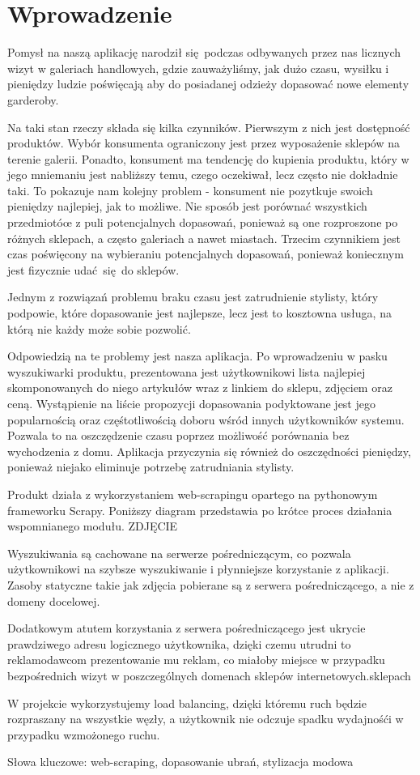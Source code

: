 \chapter{Wprowadzenie}

Pomysł na naszą aplikację narodził się podczas odbywanych przez nas licznych wizyt w galeriach handlowych, gdzie zauważyliśmy, jak dużo czasu, wysiłku i pieniędzy ludzie poświęcają aby do posiadanej odzieży dopasować nowe elementy garderoby.

Na taki stan rzeczy składa się kilka czynników. Pierwszym z nich jest dostępność produktów. Wybór konsumenta ograniczony jest przez wyposażenie sklepów na terenie galerii. Ponadto, konsument ma tendencję do kupienia produktu, który w jego mniemaniu jest nabliższy temu, czego oczekiwał, lecz często nie dokładnie taki. To pokazuje nam kolejny problem - konsument nie pozytkuje swoich pieniędzy najlepiej, jak to możliwe. Nie sposób jest porównać wszystkich przedmiotóœ z puli potencjalnych dopasowań, ponieważ są one rozproszone po różnych sklepach, a często galeriach a nawet miastach. Trzecim czynnikiem jest czas poświęcony na wybieraniu potencjalnych dopasowań, ponieważ koniecznym jest fizycznie udać się do sklepów.

Jednym z rozwiązań problemu braku czasu jest zatrudnienie stylisty, który podpowie, które dopasowanie jest najlepsze, lecz jest to kosztowna usługa, na którą nie każdy może sobie pozwolić.

Odpowiedzią na te problemy jest nasza aplikacja. Po wprowadzeniu w pasku wyszukiwarki produktu, prezentowana jest użytkownikowi lista najlepiej skomponowanych do niego artykułów wraz z linkiem do sklepu, zdjęciem oraz ceną.
Wystąpienie na liście propozycji dopasowania podyktowane jest jego popularnością oraz częśtotliwością doboru wśród innych użytkowników systemu.
Pozwala to na oszczędzenie czasu poprzez możliwość porównania bez wychodzenia z domu.
Aplikacja przyczynia się również do oszczędności pieniędzy, ponieważ niejako eliminuje potrzebę zatrudniania stylisty.

Produkt działa z wykorzystaniem web-scrapingu opartego na pythonowym frameworku Scrapy.
Poniższy diagram przedstawia po krótce proces działania wspomnianego modułu.
ZDJĘCIE

Wyszukiwania są cachowane na serwerze pośredniczącym, co pozwala użytkownikowi na szybsze wyszukiwanie i płynniejsze korzystanie z aplikacji.
Zasoby statyczne takie jak zdjęcia pobierane są z serwera pośredniczącego, a nie z domeny docelowej.

Dodatkowym atutem korzystania z serwera pośredniczącego jest ukrycie prawdziwego adresu logicznego użytkownika, dzięki czemu utrudni to reklamodawcom prezentowanie mu reklam, co miałoby miejsce w przypadku bezpośrednich wizyt w poszczególnych domenach sklepów internetowych.sklepach

W projekcie wykorzystujemy load balancing, dzięki któremu ruch będzie rozpraszany na wszystkie węzły, a użytkownik nie odczuje spadku wydajnośći w przypadku wzmożonego ruchu.

Słowa kluczowe: web-scraping, dopasowanie ubrań, stylizacja modowa